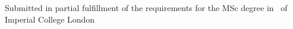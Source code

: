 \begin{titlepage}
\vfill %
Submitted in partial fulfillment of the requirements for the MSc degree in
\degreetype~of Imperial College London\\[0.5cm]

\makeatletter
\@date 
\makeatother


\end{titlepage}

